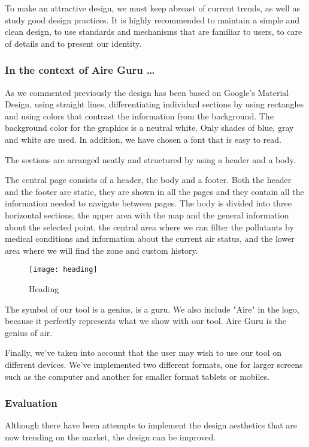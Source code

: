 To make an attractive design, we must keep abreast of current trends, as well as study good design practices.
It is highly recommended to maintain a simple and clean design, to use standards and mechanisms that are familiar to users,
to care of details and to present our identity.

\subsubsection*{In the context of Aire Guru \ldots}

As we commented previously the design has been based on Google's Material Design, using straight lines, differentiating individual sections by using rectangles and using colors that contrast the information from the background.
The background color for the graphics is a neutral white. Only shades of blue, gray and white are used. In addition, we have chosen a font that is easy to read.

The sections are arranged neatly and structured by using a header and a body.

The central page consists of a header, the body and a footer. Both the header and the footer are static,
they are shown in all the pages and they contain all the information needed to navigate between pages.
The body is divided into three horizontal sections, the upper area with the map and the general information about the selected point,
the central area where we can filter the pollutants by medical conditions and information about the current air status, and the
lower area where we will find the zone and custom history.

\begin{figure}[ht]
    \centering
    \texttt{[image: heading]}
    \caption{Heading}
\end{figure}
 
    The symbol of our tool is a genius, is a guru. We also include "Aire" in the logo, because it perfectly represents 
    what we show with our tool. Aire Guru is the genius of air.
    
    Finally, we've taken into account that the user may wish to use our tool on different devices. We've implemented
    two different formats, one for larger screens such as the computer and another for smaller format tablets or mobiles.

\subsubsection*{Evaluation}  

\begin{itemize}
    \done
    \crossed Although there have been attempts to implement the design aesthetics that are now trending on the market, the design can be improved.
\end{itemize}